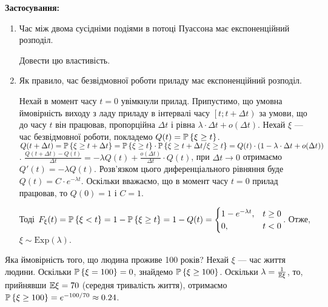 \noindent\textbf{Застосування:}
\begin{enumerate}
    \item Час між двома сусідніми подіями в потоці Пуассона має експоненційний розподіл.
    \begin{exercise}
        Довести цю властивість.
    \end{exercise}
    \item Як правило, час безвідмовної роботи приладу має експоненційний розподіл.
    
    Нехай в момент часу $t=0$ увімкнули прилад. Припустимо, що умовна ймовірність виходу з ладу
    приладу в інтервалі часу $\left[ t; t+\Delta t\right)$ за умови, що до часу $t$ він працював,
    пропорційна $\Delta t$ і рівна $\lambda\cdot \Delta t + o(\Delta t)$. Нехай $\xi$ --- час безвідмовної роботи,
    покладемо $Q(t) = \P\left\{\xi \geq t\right\}$.
    $Q(t+\Delta t) = \P\left\{\xi \geq t + \Delta t\right\} = \P\left\{\xi \geq t\right\} \cdot \P\left\{\xi \geq t+\Delta t / \xi \geq t\right\} = 
    Q(t) \cdot (1 - \lambda\cdot \Delta t + o(\Delta t))$.
    $\frac{Q(t+\Delta t) - Q(t)}{\Delta t} = -\lambda Q(t) + \frac{o(\Delta t)}{\Delta t} \cdot Q(t)$,
    при $\Delta t \rightarrow 0$ отримаємо $Q'(t) = -\lambda Q(t)$.
    Розв'язком цього диференціального рівняння буде $Q(t) = C\cdot e^{-\lambda t}$.
    Оскільки вважаємо, що в момент часу $t=0$ прилад працював, то $Q(0) = 1$ і $C=1$.

    Тоді $F_\xi(t) = \P\left\{ \xi < t\right\} = 1 - \P\left\{ \xi \geq t\right\} = 1 - Q(t) = \begin{cases}
        1 - e^{-\lambda t}, & t \geq 0 \\
        0, & t < 0
    \end{cases}$. Отже, $\xi \sim \mathrm{Exp}(\lambda)$.
\end{enumerate}

\begin{example}
    Яка ймовірність того, що людина проживе 100 років? Нехай $\xi$ --- час життя людини.
    Оскільки $\P\left\{\xi = 100\right\} = 0$, знайдемо $\P\left\{ \xi \geq 100\right\}$.
    Оскільки $\lambda = \frac{1}{\E\xi}$, то, прийнявши $\E\xi = 70$ (середня тривалість життя),
    отримаємо $\P\left\{ \xi \geq 100\right\} = e^{-100/70} \approx 0.24$.
\end{example}

